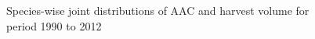 \begin{figure}[t]
    \centering
  \caption{Species-wise joint distributions of AAC and harvest volume for period 1990 to 2012}
  \label{fig:jointdist}
\end{figure}



